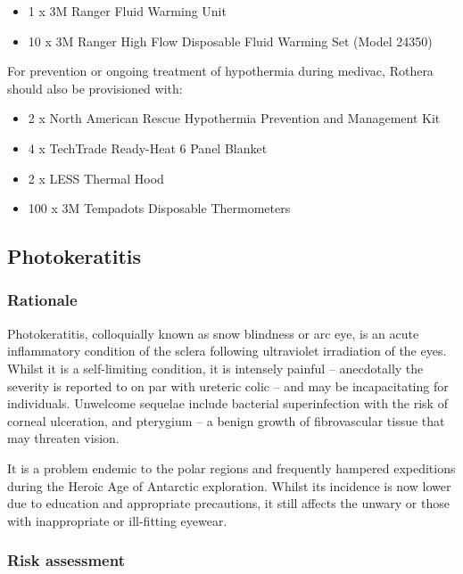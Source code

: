 \documentclass[12pt,a4paper]{article}
\begin{document}
\begin{enumerate}
\begin{itemize}
        \item 1 x 3M Ranger Fluid Warming Unit
        \item 10 x 3M Ranger High Flow Disposable Fluid Warming Set (Model 24350)
    \end{itemize}
    For prevention or ongoing treatment of hypothermia during medivac, Rothera should also be provisioned with:
    \begin{itemize}
        \item 2 x North American Rescue Hypothermia Prevention and Management Kit
        \item 4 x TechTrade Ready-Heat 6 Panel Blanket
        \item 2 x LESS Thermal Hood
        \item 100 x 3M Tempadots Disposable Thermometers
    \end{itemize}
\end{enumerate}

\subsection{Photokeratitis}

\subsubsection{Rationale}

Photokeratitis, colloquially known as snow blindness or arc eye, is an acute inflammatory condition of the sclera following ultraviolet irradiation of the eyes. Whilst it is a self-limiting condition, it is intensely painful -- anecdotally the severity is reported to on par with ureteric colic -- and may be incapacitating for individuals. Unwelcome sequelae include bacterial superinfection with the risk of corneal ulceration, and pterygium -- a benign growth of fibrovascular tissue that may threaten vision.

It is a problem endemic to the polar regions and frequently hampered expeditions during the Heroic Age of Antarctic exploration.\cite{Guly:2012kl} Whilst its incidence is now lower due to education and appropriate precautions, it still affects the unwary or those with inappropriate or ill-fitting eyewear.\cite{BritishAntarcticSurveyMedicalUnit:2013vj}

\subsubsection{Risk assessment}
\end{document}

